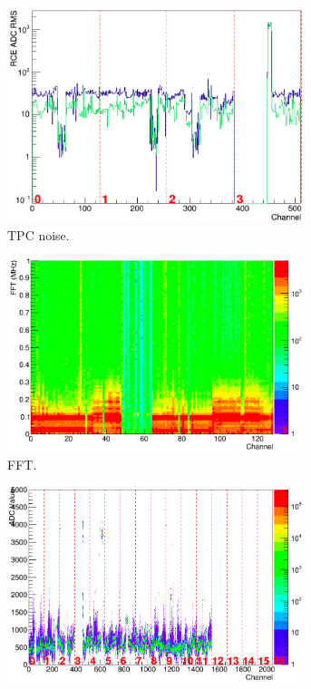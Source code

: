 \begin{figure}
  \centering
  \begin{subfigure}[t]{0.48\linewidth}
    \centering
    \includegraphics[width=0.95\textwidth]{DQM1.png}
    \caption{TPC noise.}
    \label{fig:DQMPlot1}
  \end{subfigure}
  \begin{subfigure}[t]{0.48\linewidth}
    \centering
    \includegraphics[width=0.95\textwidth]{DQM2.png}
    \caption{FFT.}
    \label{fig:DQMPlot2}
  \end{subfigure}
  \begin{subfigure}[t]{0.48\linewidth}
    \centering
    \includegraphics[width=0.95\textwidth]{DQM3.png}

\end{subfigure}
\end{figure}
